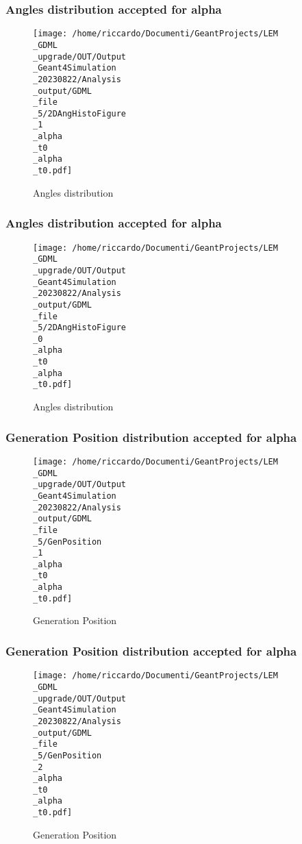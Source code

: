 \documentclass[8pt]{beamer}
\begin{document}
            \begin{frame}
                \frametitle{Angles distribution accepted for alpha}
            
        \begin{figure}[h]
            \centering
            \texttt{[image: /home/riccardo/Documenti/GeantProjects/LEM\\\_GDML\\\_upgrade/OUT/Output\\\_Geant4Simulation\\\_20230822/Analysis\\\_output/GDML\\\_file\\\_5/2DAngHistoFigure\\\_1\\\_alpha\\\_t0\\\_alpha\\\_t0.pdf]}
            \caption{Angles distribution}
        \end{figure}
        
            \end{frame}
            
            \begin{frame}
                \frametitle{Angles distribution accepted for alpha}
            
        \begin{figure}[h]
            \centering
            \texttt{[image: /home/riccardo/Documenti/GeantProjects/LEM\\\_GDML\\\_upgrade/OUT/Output\\\_Geant4Simulation\\\_20230822/Analysis\\\_output/GDML\\\_file\\\_5/2DAngHistoFigure\\\_0\\\_alpha\\\_t0\\\_alpha\\\_t0.pdf]}
            \caption{Angles distribution}
        \end{figure}
        
            \end{frame}
            
            \begin{frame}
                \frametitle{Generation Position distribution accepted for alpha}
            
        \begin{figure}[h]
            \centering
            \texttt{[image: /home/riccardo/Documenti/GeantProjects/LEM\\\_GDML\\\_upgrade/OUT/Output\\\_Geant4Simulation\\\_20230822/Analysis\\\_output/GDML\\\_file\\\_5/GenPosition\\\_1\\\_alpha\\\_t0\\\_alpha\\\_t0.pdf]}
            \caption{Generation Position}
        \end{figure}
        
            \end{frame}
            
            \begin{frame}
                \frametitle{Generation Position distribution accepted for alpha}
            
        \begin{figure}[h]
            \centering
            \texttt{[image: /home/riccardo/Documenti/GeantProjects/LEM\\\_GDML\\\_upgrade/OUT/Output\\\_Geant4Simulation\\\_20230822/Analysis\\\_output/GDML\\\_file\\\_5/GenPosition\\\_2\\\_alpha\\\_t0\\\_alpha\\\_t0.pdf]}
            \caption{Generation Position}
        \end{figure}
        
            \end{frame}
            
\end{document}
